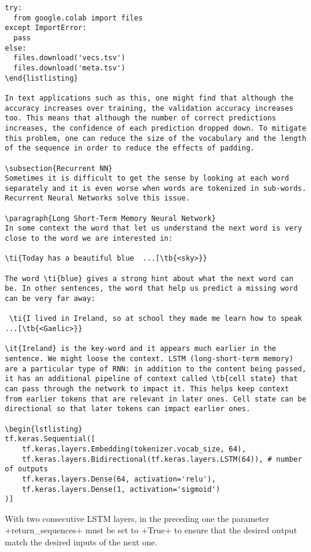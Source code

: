 \begin{lstlisting}
try:
  from google.colab import files
except ImportError:
  pass
else:
  files.download('vecs.tsv')
  files.download('meta.tsv')
\end{listlisting}

In text applications such as this, one might find that although the accuracy increases over training, the validation accuracy increases too. This means that although the number of correct predictions increases, the confidence of each prediction dropped down. To mitigate this problem, one can reduce the size of the vocabulary and the length of the sequence in order to reduce the effects of padding.

\subsection{Recurrent NN}
Sometimes it is difficult to get the sense by looking at each word separately and it is even worse when words are tokenized in sub-words. Recurrent Neural Networks solve this issue.

\paragraph{Long Short-Term Memory Neural Network}
In some context the word that let us understand the next word is very close to the word we are interested in:

\ti{Today has a beautiful blue  ...[\tb{<sky>}} 

The word \ti{blue} gives a strong hint about what the next word can be. In other sentences, the word that help us predict a missing word can be very far away:
 
 \ti{I lived in Ireland, so at school they made me learn how to speak  ...[\tb{<Gaelic>}} 

\it{Ireland} is the key-word and it appears much earlier in the sentence. We might loose the context. LSTM (long-short-term memory) are a particular type of RNN: in addition to the content being passed, it has an additional pipeline of context called \tb{cell state} that can pass through the network to impact it. This helps keep context from earlier tokens that are relevant in later ones. Cell state can be directional so that later tokens can impact earlier ones.

\begin{lstlisting}
tf.keras.Sequential([
	tf.keras.layers.Embedding(tokenizer.vocab_size, 64),
	tf.keras.layers.Bidirectional(tf.keras.layers.LSTM(64)), # number of outputs
	tf.keras.layers.Dense(64, activation='relu'),
	tf.keras.layers.Dense(1, activation='sigmoid')
)]
\end{lstlisting}
With two consecutive LSTM layers, in the preceding one the parameter \cd+return_sequences+ must be set to \cd+True+ to ensure that the desired output match the desired inputs of the next one.

